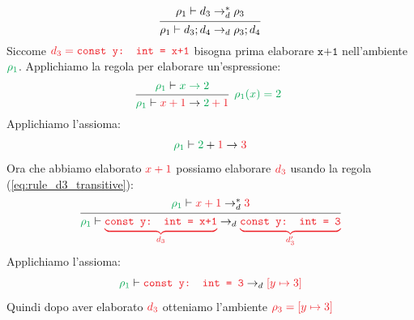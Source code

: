\documentclass[a4paper]{article}
\begin{document}
\begin{example}
\begin{enumerate}
\begin{enumerate}
\begin{equation}
            \begin{prooftree}
              \hypo{ 
                \rho_1 \vdash d_3 \to_d^* \rho_3
              }
              \infer1{ 
                \rho_1 \vdash d_3; d_4 \to_d \rho_3; d_4
              }
            \end{prooftree}
          \end{equation} 
          Siccome
          \( \mathcolor{\dThree}{d_3 = \texttt{const y: int = x+1}} \)
          bisogna prima elaborare \( \texttt{x+1} \) nell'ambiente \( \mathcolor{\dOne}{\rho_1} \).
          Applichiamo la regola per elaborare un'espressione:
          \[
            \begin{prooftree}
              \hypo{ 
                \mathcolor{\dOne}{\rho_1} \vdash \mathcolor{\dOne}{x \to 2}
              }
              \infer1[\( \mathcolor{\dOne}{\rho_1(x) = 2} \) ]{ 
                \mathcolor{\dOne}{\rho_1} \vdash
                \mathcolor{\dThree}{x+1} \to \mathcolor{\dOne}{2}
                \mathcolor{\dThree}{+ 1}
              }
            \end{prooftree}
          \] 
          Applichiamo l'assioma:
          \[
            \mathcolor{\dOne}{\rho_1} \vdash \mathcolor{\dOne}{2} +
            \mathcolor{\dThree}{1} \to \mathcolor{\dThree}{3}
          \] 
          Ora che abbiamo elaborato \( \mathcolor{\dThree}{x+1} \) possiamo elaborare
          \( \mathcolor{\dThree}{d_3} \) usando la regola (\ref{eq:rule_d3_transitive}):
          \[
            \begin{prooftree}
              \hypo{ 
                \mathcolor{\dOne}{\rho_1} \vdash \mathcolor{\dThree}{x+1} \to_d^*
                \mathcolor{\dThree}{3}
              }
              \infer1{
                \mathcolor{\dOne}{\rho_1} \vdash
                \mathcolor{\dThree}{
                  \underbrace{
                    \texttt{const y: int = x+1}
                  }_{\mathcolor{\dThree}{d_3}}
                }
                \to_d
                \mathcolor{\dThree}{
                  \underbrace{
                    \texttt{const y: int = 3}
                  }_{\mathcolor{\dThree}{d_3'}}
                }
              }
            \end{prooftree}
          \] 
          Applichiamo l'assioma:
          \[
            \mathcolor{\dOne}{\rho_1} \vdash
            \mathcolor{\dThree}{
              \texttt{const y: int = 3}
            }
            \to_d
            \mathcolor{\dThree}{\left[ y \mapsto 3 \right]}
          \] 
          Quindi dopo aver elaborato \( \mathcolor{\dThree}{d_3} \) otteniamo
          l'ambiente \( \mathcolor{\dThree}{\rho_3 = \left[ y \mapsto 3 \right]} \)


\end{enumerate}
\end{enumerate}
\end{example}
\end{document}
